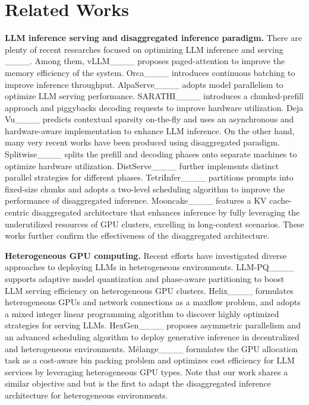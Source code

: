 \section{Related Works}
\textbf{LLM inference serving and disaggregated inference paradigm.} There are plenty of recent researches focused on optimizing LLM inference and serving ____. Among them, 
vLLM____ proposes paged-attention to improve the memory efficiency of the system.
Orca____ introduces continuous batching to improve inference throughput. 
AlpaServe____ adopts model parallelism to optimize LLM serving performance.
SARATHI____ introduces a chunked-prefill approach and piggybacks decoding requests to improve hardware utilization. 
Deja Vu____ predicts contextual sparsity on-the-fly and uses an asynchronous and hardware-aware implementation to enhance LLM inference. 
On the other hand, many very recent works have been produced using disaggregated paradigm. 
Splitwise____ splits the prefill and decoding phases onto separate machines to optimize hardware utilization. 
DistServe____ further implements distinct parallel strategies for different phases. TetriInfer____ partitions prompts into fixed-size chunks and adopts a two-level scheduling algorithm to improve the performance of disaggregated inference. Mooncake____ features a KV cache-centric disaggregated architecture that enhances inference by fully leveraging the underutilized resources of GPU clusters, excelling in long-context scenarios. 
These works further confirm the effectiveness of the disaggregated architecture.




\textbf{Heterogeneous GPU computing.} 
Recent efforts have investigated diverse approaches to deploying LLMs in heterogeneous environments. 
LLM-PQ____ supports adaptive model quantization and phase-aware partitioning to boost LLM serving efficiency on heterogeneous GPU clusters. 
Helix____ formulates heterogeneous GPUs and network connections as a maxflow problem, and adopts a mixed integer linear programming algorithm to discover highly optimized strategies for serving LLMs. HexGen____ proposes asymmetric parallelism and an advanced scheduling algorithm to deploy generative inference in decentralized and heterogeneous environments. Mélange____ formulates the GPU allocation task as a cost-aware bin packing problem and optimizes cost efficiency for LLM services by leveraging heterogeneous GPU types. 
Note that our work shares a similar objective and but is the first to adapt the disaggregated inference architecture for heterogeneous environments.


\vspace{-0.5em}